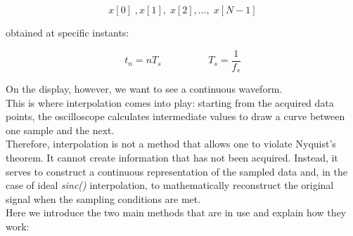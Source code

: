 \documentclass[../main.tex]{subfiles}
\begin{document}
\begin{equation}
	x[0]\;,x[1],\;x[2], \dots ,\;x[N-1]
\end{equation}

obtained at specific instants:

\begin{equation}
	t_n = nT_s \hspace{2cm} T_s = \frac{1}{f_s}
\end{equation}

On the display, however, we want to see a continuous waveform.\\

This is where interpolation comes into play: starting from the acquired data points, the oscilloscope calculates intermediate values to draw a curve between one sample and the next.\\

Therefore, interpolation is not a method that allows one to violate Nyquist’s theorem. It cannot create information that has not been acquired. Instead, it serves to construct a continuous representation of the sampled data and, in the case of ideal \textit{sinc()} interpolation, to mathematically reconstruct the original signal when the sampling conditions are met.\\

Here we introduce the two main methods that are in use and explain how they work:
\end{document}
